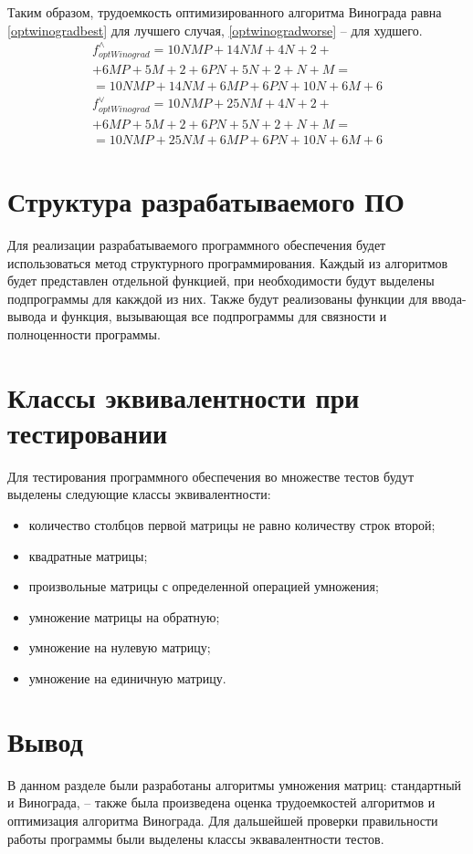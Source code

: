 Таким образом, трудоемкость оптимизированного алгоритма Винограда равна
\ref{optwinogradbest} для лучшего случая, \ref{optwinogradworse} -- для
худшего.
    \begin{multline}\label{optwinogradbest}
        f_{optWinograd}^{\wedge} = 10NMP + 14NM + 4N + 2 + \\
                                + 6MP + 5M + 2
                                + 6PN + 5N + 2 + N + M = \\
                                = 10NMP + 14NM + 6MP
                                + 6PN + 10N + 6M + 6
    \end{multline}
    \begin{multline}\label{optwinogradworse}
        f_{optWinograd}^{\vee} = 10NMP + 25NM + 4N + 2 + \\
                              + 6MP + 5M + 2
                              + 6PN + 5N + 2 + N + M = \\
                              = 10NMP + 25NM + 6MP
                              + 6PN + 10N + 6M + 6
    \end{multline}

\section{Структура разрабатываемого ПО}

Для реализации разрабатываемого программного обеспечения будет использоваться
метод структурного программирования. Каждый из алгоритмов будет представлен
отдельной функцией, при необходимости будут выделены подпрограммы для какждой
из них. Также будут реализованы функции для ввода-вывода
и функция, вызывающая все подпрограммы для связности и полноценности
программы.

\section{Классы эквивалентности при тестировании}

Для тестирования программного обеспечения во множестве тестов будут выделены
следующие классы эквивалентности:
\begin{itemize}[left=\parindent]
    \item количество столбцов первой матрицы не равно количеству строк второй;
    \item квадратные матрицы;
    \item произвольные матрицы с определенной операцией умножения;
    \item умножение матрицы на обратную;
    \item умножение на нулевую матрицу;
    \item умножение на единичную матрицу.
\end{itemize}

\section{Вывод}

В данном разделе были разработаны алгоритмы умножения матриц: стандартный и Винограда, -- также была произведена оценка трудоемкостей алгоритмов и оптимизация алгоритма Винограда. Для дальшейшей проверки правильности работы программы были выделены классы эквавалентности тестов.
